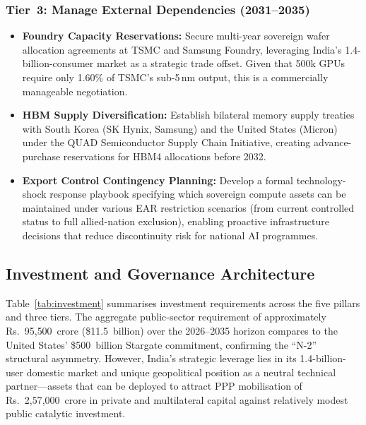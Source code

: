 \documentclass[conference]{IEEEtran}
\begin{document}
\subsubsection{Tier~3: Manage External Dependencies (2031--2035)}

\begin{itemize}[leftmargin=*, noitemsep, topsep=2pt]
  \item \textbf{Foundry Capacity Reservations:} Secure multi-year sovereign wafer allocation agreements at TSMC and Samsung Foundry, leveraging India's 1.4-billion-consumer market as a strategic trade offset. Given that 500k GPUs require only 1.60\% of TSMC's sub-5\,nm output, this is a commercially manageable negotiation.
  \item \textbf{HBM Supply Diversification:} Establish bilateral memory supply treaties with South Korea (SK Hynix, Samsung) and the United States (Micron) under the QUAD Semiconductor Supply Chain Initiative, creating advance-purchase reservations for HBM4 allocations before 2032.
  \item \textbf{Export Control Contingency Planning:} Develop a formal technology-shock response playbook specifying which sovereign compute assets can be maintained under various EAR restriction scenarios (from current controlled status to full allied-nation exclusion), enabling proactive infrastructure decisions that reduce discontinuity risk for national AI programmes.
\end{itemize}

\subsection{Investment and Governance Architecture}

Table~\ref{tab:investment} summarises investment requirements across the five pillars and three tiers. The aggregate public-sector requirement of approximately Rs.~95{,}500~crore (\$11.5~billion) over the 2026--2035 horizon compares to the United States' \$500~billion Stargate commitment, confirming the ``N-2'' structural asymmetry. However, India's strategic leverage lies in its 1.4-billion-user domestic market and unique geopolitical position as a neutral technical partner---assets that can be deployed to attract PPP mobilisation of Rs.~2{,}57{,}000~crore in private and multilateral capital against relatively modest public catalytic investment.
\end{document}
